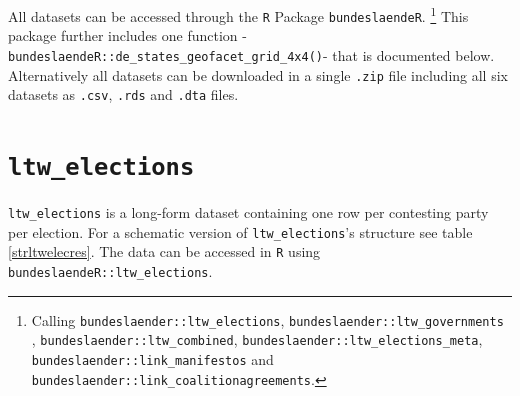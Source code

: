 \documentclass[
]{scrartcl}
\begin{document}
All datasets can be accessed through the \texttt{R} Package
\texttt{bundeslaendeR}.
\footnote{Calling \texttt{bundeslaender::ltw\_elections}, \texttt{bundeslaender::ltw\_governments} , \texttt{bundeslaender::ltw\_combined},
\texttt{bundeslaender::ltw\_elections\_meta}, \texttt{bundeslaender::link\_manifestos} and \texttt{bundeslaender::link\_coalitionagreements}.}
This package further includes one function
-\texttt{bundeslaendeR::de\_states\_geofacet\_grid\_4x4()}- that is
documented below. Alternatively all datasets can be downloaded in a
single \texttt{.zip} file including all six datasets as \texttt{.csv},
\texttt{.rds} and \texttt{.dta} files.

\newpage

\section{\texorpdfstring{\texttt{ltw\_elections}}{ltw\_elections}}\label{ltw_elections}

\texttt{ltw\_elections} is a long-form dataset containing one row per
contesting party per election. For a schematic version of
\texttt{ltw\_elections}'s structure see table\(~\)\ref{strltwelecres}.
The data can be accessed in \texttt{R} using
\texttt{bundeslaendeR::ltw\_elections}.
\end{document}
